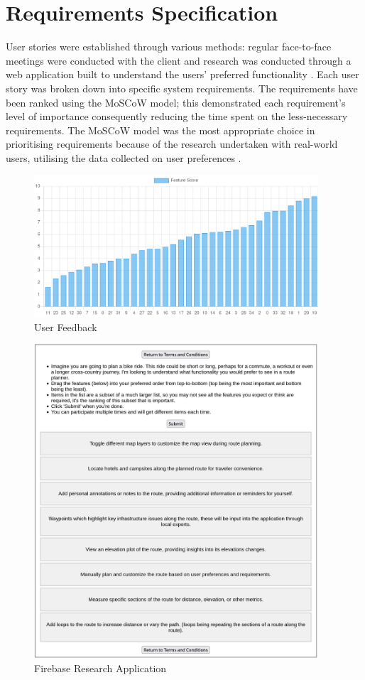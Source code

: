 \section{Requirements Specification}
\label{requirements:specification}

User stories were established through various methods: regular face-to-face meetings were conducted with the client  and research was conducted through a web application built to understand the users' preferred functionality . Each user story was broken down into specific system requirements. The requirements have been ranked using the MoSCoW model; this demonstrated each requirement's level of importance consequently reducing the time spent on the less-necessary requirements. The MoSCoW model was the most appropriate choice in prioritising requirements because of the research undertaken with real-world users, utilising the data collected on user preferences .

\begin{figure}[!h]
  \centering
  \includegraphics[width=400px]{figures/logarithmic-scoring.png}
  \caption{User Feedback}
  \label{fig:userfeedback01}
\end{figure}

\begin{figure}
  \centering
  \includegraphics[width=400px]{figures/research-application.png}
  \caption{Firebase Research Application}
  \label{fig:researchapp}
\end{figure}

